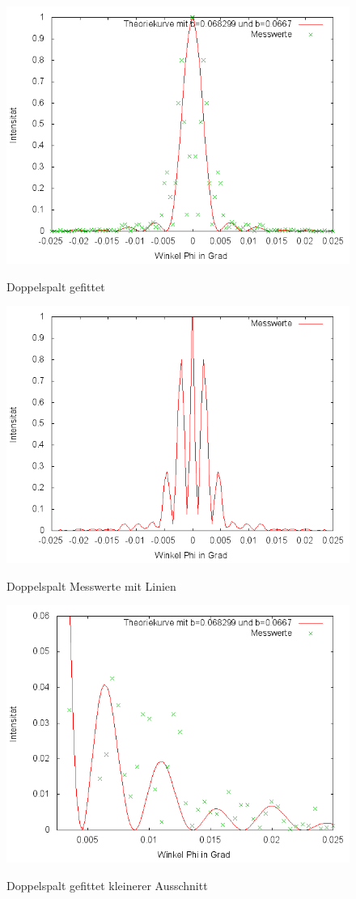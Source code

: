 \begin{figure}[htbp]
\includegraphics[width=12cm]{pics/9.png}
\centering
\label{a9}
\caption{Doppelspalt gefittet}
\end{figure}

\begin{figure}[htbp]
\includegraphics[width=12cm]{pics/10.png}
\centering
\label{a10}
\caption{Doppelspalt Messwerte mit Linien}
\end{figure}


\begin{figure}[htbp]
\includegraphics[width=12cm]{pics/11.png}
\centering
\label{a11}
\caption{Doppelspalt gefittet kleinerer Ausschnitt}
\end{figure}

